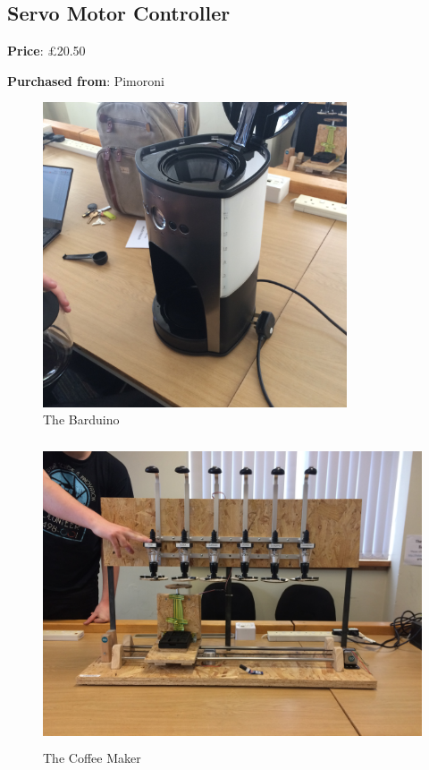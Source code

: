 \documentclass[12pt, a4paper]{article}
\begin{document}

\subsection{Servo Motor Controller}
\textbf{Price}: £20.50

\textbf{Purchased from}: Pimoroni
\newpage

\begin{figure}[H]
    \centering    
    \includegraphics[height=9cm, angle=270]{images/coffee}
    \caption{The Barduino}
\end{figure}

\begin{figure}[H]
    \centering    
    \includegraphics[height=9cm]{images/barduino}
    \caption{The Coffee Maker}
\end{figure}
\end{document}
